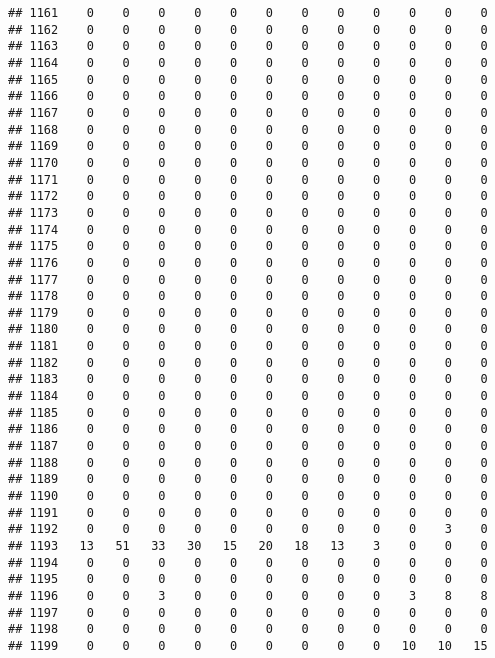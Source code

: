 \documentclass[]{article}
\begin{document}
\begin{verbatim}
## 1161    0    0    0    0    0    0    0    0    0    0    0    0
## 1162    0    0    0    0    0    0    0    0    0    0    0    0
## 1163    0    0    0    0    0    0    0    0    0    0    0    0
## 1164    0    0    0    0    0    0    0    0    0    0    0    0
## 1165    0    0    0    0    0    0    0    0    0    0    0    0
## 1166    0    0    0    0    0    0    0    0    0    0    0    0
## 1167    0    0    0    0    0    0    0    0    0    0    0    0
## 1168    0    0    0    0    0    0    0    0    0    0    0    0
## 1169    0    0    0    0    0    0    0    0    0    0    0    0
## 1170    0    0    0    0    0    0    0    0    0    0    0    0
## 1171    0    0    0    0    0    0    0    0    0    0    0    0
## 1172    0    0    0    0    0    0    0    0    0    0    0    0
## 1173    0    0    0    0    0    0    0    0    0    0    0    0
## 1174    0    0    0    0    0    0    0    0    0    0    0    0
## 1175    0    0    0    0    0    0    0    0    0    0    0    0
## 1176    0    0    0    0    0    0    0    0    0    0    0    0
## 1177    0    0    0    0    0    0    0    0    0    0    0    0
## 1178    0    0    0    0    0    0    0    0    0    0    0    0
## 1179    0    0    0    0    0    0    0    0    0    0    0    0
## 1180    0    0    0    0    0    0    0    0    0    0    0    0
## 1181    0    0    0    0    0    0    0    0    0    0    0    0
## 1182    0    0    0    0    0    0    0    0    0    0    0    0
## 1183    0    0    0    0    0    0    0    0    0    0    0    0
## 1184    0    0    0    0    0    0    0    0    0    0    0    0
## 1185    0    0    0    0    0    0    0    0    0    0    0    0
## 1186    0    0    0    0    0    0    0    0    0    0    0    0
## 1187    0    0    0    0    0    0    0    0    0    0    0    0
## 1188    0    0    0    0    0    0    0    0    0    0    0    0
## 1189    0    0    0    0    0    0    0    0    0    0    0    0
## 1190    0    0    0    0    0    0    0    0    0    0    0    0
## 1191    0    0    0    0    0    0    0    0    0    0    0    0
## 1192    0    0    0    0    0    0    0    0    0    0    3    0
## 1193   13   51   33   30   15   20   18   13    3    0    0    0
## 1194    0    0    0    0    0    0    0    0    0    0    0    0
## 1195    0    0    0    0    0    0    0    0    0    0    0    0
## 1196    0    0    3    0    0    0    0    0    0    3    8    8
## 1197    0    0    0    0    0    0    0    0    0    0    0    0
## 1198    0    0    0    0    0    0    0    0    0    0    0    0
## 1199    0    0    0    0    0    0    0    0    0   10   10   15

\end{verbatim}
\end{document}
